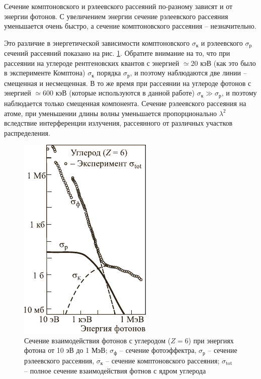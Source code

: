 \documentclass[a4paper, 12pt]{article}
\begin{document}
Сечение комптоновского и рэлеевского рассеяний по-разному зависят и от энергии фотонов. С увеличением энергии сечение рэлеевского рассеяния уменьшается очень быстро, а сечение комптоновского рассеяния -- незначительно.\par
Это различие в энергетической зависимости комптоновского $\sigma_{\text{к}}$ и рэлеевского $\sigma_{\text{р}}$ сечений рассеяний показано на рис. \ref{pic2}. Обратите внимание на то, что при рассеянии на углероде рентгеновских квантов с энергией $\simeq 20$ кэВ (как это было в эксперименте Комптона) $\sigma_{\text{к}}$ порядка $\sigma_{\text{р}}$, и поэтому наблюдаются две линии -- смещенная и несмещенная. В то же время при рассеянии на углероде фотонов с энергией $\simeq 600$ кэВ (которые используются в данной работе) $\sigma_{\text{к}} \gg \sigma_{\text{р}}$, и поэтому наблюдается только смещенная компонента. Сечение рэлеевского рассеяния на атоме, при уменьшении длины волны уменьшается пропорционально $\lambda^2$ вследствие интерференции излучения, рассеянного от различных участков распределения.\par
\begin{figure}
	\begin{center}
		\includegraphics[scale=1.2]{pic2.pdf}
		\caption{Сечение взаимодействия фотонов с углеродом ($Z=6$) при энергиях фотона от 10 эВ до 1 МэВ; $\sigma_{\text{ф}}$ -- сечение фотоэффектра, $\sigma_{\text{р}}$ -- сечение рэлеевского рассеяния, $\sigma_{\text{к}}$ -- сечение комптоновского рассеяния; $\sigma_{\text{tot}}$ -- полное сечение взаимодействия фотнов с ядром углерода}
		\label{pic2}
	\end{center}	
\end{figure}
\end{document}
